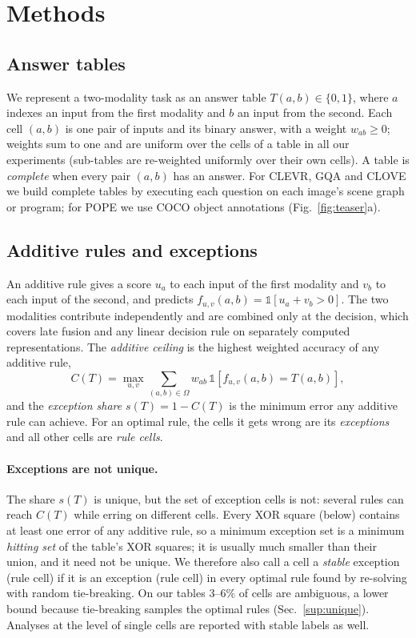 \section{Methods}
\label{sec:theory}
\subsection{Answer tables}

We represent a two-modality task as an answer table $T(a,b)\in\{0,1\}$, where $a$ indexes an input from the first
modality and $b$ an input from the second. Each cell $(a,b)$ is one pair of inputs and its binary answer, with a
weight $w_{ab}\ge 0$; weights sum to one and are uniform over the cells of a table in all our experiments (sub-tables
are re-weighted uniformly over their own cells). A table is \emph{complete} when every pair $(a,b)$ has an answer. For
CLEVR, GQA and CLOVE we build complete tables by executing each question on each image's scene graph or program; for
POPE we use COCO object annotations (Fig.~\ref{fig:teaser}a).

\subsection{Additive rules and exceptions}

An additive rule gives a score $u_a$ to each input of the first modality and $v_b$ to each input of the second, and
predicts $f_{u,v}(a,b)=\mathbb{1}[u_a+v_b>0]$. The two modalities contribute independently and are combined only at
the decision, which covers late fusion and any linear decision rule on separately computed representations. The
\emph{additive ceiling} is the highest weighted accuracy of any additive rule,
\begin{equation}
C(T)=\max_{u,v}\sum_{(a,b)\in\Omega} w_{ab}\,\mathbb{1}\!\left[f_{u,v}(a,b)=T(a,b)\right],
\label{eq:ceiling}
\end{equation}
and the \emph{exception share} $s(T)=1-C(T)$ is the minimum error any additive rule can achieve. For an optimal rule,
the cells it gets wrong are its \emph{exceptions} and all other cells are \emph{rule cells}.

\paragraph{Exceptions are not unique.}
The share $s(T)$ is unique, but the set of exception cells is not: several rules can reach $C(T)$ while erring on
different cells. Every XOR square (below) contains at least one error of any additive rule, so a minimum exception set
is a minimum \emph{hitting set} of the table's XOR squares; it is usually much smaller than their union, and it need
not be unique. We therefore also call a cell a \emph{stable} exception (rule cell) if it is an exception (rule cell) in
every optimal rule found by re-solving with random tie-breaking. On our tables 3--6\% of cells are ambiguous, a lower
bound because tie-breaking samples the optimal rules (Sec.~\ref{sup:unique}). Analyses at the level of single cells
are reported with stable labels as well.

